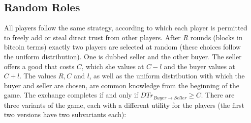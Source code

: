 \subsection{Random Roles}
  All players follow the same strategy, according to which each player is permitted to freely add or steal direct trust from
  other players. After $R$ rounds (blocks in bitcoin terms) exactly two players are selected at random (these choices follow
  the uniform distribution). One is dubbed seller and the other buyer. The seller offers a good that costs $C$, which she
  values at $C - l$ and the buyer values at $C + l$. The values $R, C$ and $l$, as well as the uniform distribution with which
  the buyer and seller are chosen, are common knowledge from the beginning of the game. The exchange completes if and only if
  $DTr_{Buyer \rightarrow Seller} \geq C$. There are three variants of the game, each with a different utility for the
  players (the first two versions have two subvariants each):

